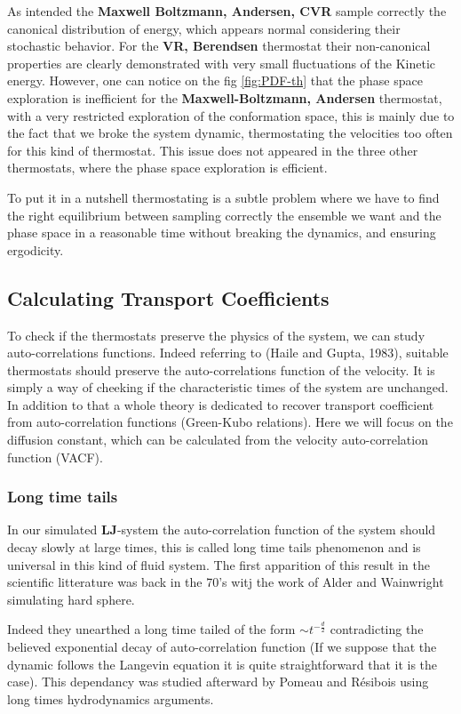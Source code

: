 \documentclass[ansiapaper]{report}
\begin{document}
\begin{multicols}{3}
 As intended the \textbf{Maxwell Boltzmann, Andersen, CVR} sample correctly the canonical distribution of energy, which appears normal considering their stochastic behavior. For the \textbf{VR, Berendsen} thermostat their non-canonical properties are clearly demonstrated with very small fluctuations of the Kinetic energy. However, one can notice on the fig \ref{fig:PDF-th} that the phase space exploration is inefficient for the \textbf{Maxwell-Boltzmann, Andersen} thermostat, with a very restricted exploration of the conformation space, this is mainly due to the fact that we broke the system dynamic, thermostating the velocities too often for this kind of thermostat. This issue does not appeared in the three other thermostats, where the phase space exploration is efficient.

 To put it in a nutshell thermostating is a subtle problem where we have to find the right equilibrium between sampling correctly the ensemble we want and the phase space in a reasonable time without breaking the dynamics, and ensuring ergodicity.

\subsection{Calculating Transport Coefficients}
To check if the thermostats preserve the physics of the system, we can study auto-correlations functions. Indeed referring to (Haile and Gupta, 1983), suitable thermostats should preserve the auto-correlations function of the velocity. It is simply a way of cheeking if the characteristic times of the system are unchanged. In addition to that a whole theory is dedicated to recover transport coefficient from auto-correlation functions (Green-Kubo relations). Here we will focus on the diffusion constant, which can be calculated from the velocity auto-correlation function (VACF).

\subsubsection{Long time tails}
In our simulated \textbf{LJ}-system the auto-correlation function of the system should decay slowly at large times, this is called long time tails phenomenon and is universal in this kind of fluid system. The first apparition of this result in the scientific litterature was back in the 70's witj the work of Alder and Wainwright simulating hard sphere. 

Indeed they unearthed a long time tailed of the form  $\sim t^{-\frac{d}{2}}$ 
contradicting the believed exponential decay of auto-correlation function (If we suppose that the dynamic follows the Langevin equation it is quite straightforward that it is the case). This dependancy was studied afterward by Pomeau and Résibois using long times hydrodynamics arguments. 


\end{multicols}
\end{document}
